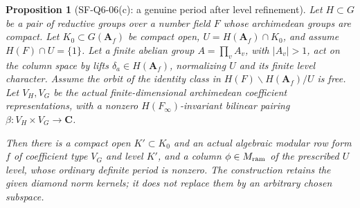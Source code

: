 \documentclass[11pt,a4paper]{article}
\newtheorem{proposition}[theorem]{Proposition}
\theoremstyle{definition}
\theoremstyle{remark}
\begin{document}
\begin{proposition}[SF-Q6-06(c): a genuine period after level refinement]
\label{prop:refined-level-ram-period}
Let $H\subset G$ be a pair of reductive groups over a number field
$F$ whose archimedean groups are compact.  Let
$K_0\subset G(\mathbf A_f)$ be compact open,
$U=H(\mathbf A_f)\cap K_0$, and assume
$H(F)\cap U=\{1\}$.
Let a finite abelian group $A=\prod_vA_v$, with $|A_v|>1$, act
on the column space by lifts $\delta_a\in H(\mathbf A_f)$,
normalizing $U$ and its finite level character.  Assume the orbit
of the identity class in
$H(F)\backslash H(\mathbf A_f)/U$ is free.
Let $V_H,V_G$ be the actual finite-dimensional archimedean coefficient
representations, with a nonzero $H(F_\infty)$-invariant bilinear
pairing $\beta:V_H\times V_G\to\mathbf C$.

Then there is a compact open $K'\subset K_0$ and an actual algebraic
modular row form $f$ of coefficient type $V_G$ and level $K'$,
and a column $\phi\in M_{\rm ram}$ of the prescribed $U$ level,
whose ordinary definite period is nonzero.  The construction retains
the given diamond norm kernels; it does not replace them by an
arbitrary chosen subspace.
\end{proposition}
\end{document}
